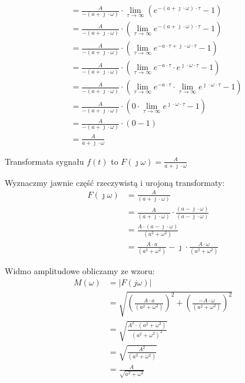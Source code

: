 \begin{task}
\begin{align*}
&=\frac{A}{-( a + \jmath \cdot \omega)} \cdot \lim_{\tau \rightarrow \infty} \left(e^{-( a + \jmath \cdot \omega) \cdot \tau} - 1\right)\\
&=\frac{A}{-( a + \jmath \cdot \omega)} \cdot \left(\lim_{\tau \rightarrow \infty} e^{-( a + \jmath \cdot \omega) \cdot \tau} - 1\right)\\
&=\frac{A}{-( a + \jmath \cdot \omega)} \cdot \left(\lim_{\tau \rightarrow \infty} e^{-a \cdot \tau + \jmath \cdot \omega \cdot \tau } - 1\right)\\
&=\frac{A}{-( a + \jmath \cdot \omega)} \cdot \left(\lim_{\tau \rightarrow \infty} e^{-a \cdot \tau} \cdot e^{\jmath \cdot \omega \cdot \tau } - 1\right)\\
&=\frac{A}{-( a + \jmath \cdot \omega)} \cdot \left(\lim_{\tau \rightarrow \infty} e^{-a \cdot \tau} \cdot \lim_{\tau \rightarrow \infty} e^{\jmath \cdot \omega \cdot \tau } - 1\right)\\
&=\frac{A}{-( a + \jmath \cdot \omega)} \cdot \left(0 \cdot \lim_{\tau \rightarrow \infty} e^{\jmath \cdot \omega \cdot \tau } - 1\right)\\
&=\frac{A}{-( a + \jmath \cdot \omega)} \cdot \left(0 - 1\right)\\
&=\frac{A}{a + \jmath \cdot \omega}
\end{align*}

Transformata sygnału $f(t)$ to $F(\jmath \omega)=\frac{A}{ a + \jmath \cdot \omega}$

Wyznaczmy jawnie część rzeczywistą i urojoną transformaty:
\begin{equation}
\begin{aligned}
F(\jmath \omega )&=\frac{A}{( a + \jmath \cdot \omega)}\\
&=\frac{A}{( a + \jmath \cdot \omega)} \cdot \frac{(a - \jmath \cdot \omega)}{(a - \jmath \cdot \omega)}\\
&=\frac{A \cdot ( a - \jmath \cdot \omega)}{( a^2 + \omega^2)}\\
&=\frac{A \cdot a}{( a^2 + \omega^2)} - \jmath \cdot \frac{A \cdot \omega}{( a^2 + \omega^2)}
\end{aligned}
\end{equation}


Widmo amplitudowe obliczamy ze wzoru:
\begin{equation}
\begin{aligned}
M(\omega)&=\left| F(j \omega) \right|\\
&=\sqrt{\left(\frac{A \cdot a}{( a^2 + \omega^2)}\right)^2 + \left(\frac{-A \cdot \omega}{( a^2 + \omega^2)}\right)^2}\\
&=\sqrt{\frac{A^2 \cdot (a^2+\omega^2)}{(a^2 + \omega^2)^2}}\\
&=\sqrt{\frac{A^2}{(a^2 + \omega^2)}}\\
&=\frac{A}{\sqrt{a^2 + \omega^2}}
\end{aligned}
\end{equation}


\end{task}
